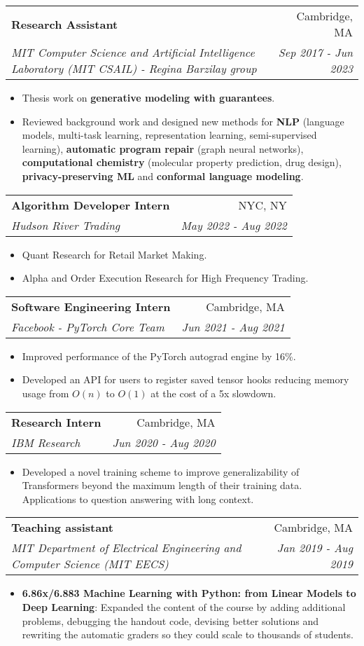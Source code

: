 \documentclass[letterpaper,10pt]{article}
\makeatletter
\newcommand{\resumeItem}[2]{
  \item\small{
    \textbf{#1}{: #2 \vspace{-2pt}}
  }
}
\newcommand{\resumeSubheading}[4]{
  \vspace{-1pt}\item[]
  \begin{tabular*}{0.98\textwidth}{l@{\extracolsep{\fill}}r}
      \hspace{-10pt}\textbf{#1} & #2 \\
      \hspace{-10pt}\textit{\small#3} & \textit{\small #4} \\
    \end{tabular*}\vspace{-5pt}
}
\newcommand{\resumeItemListStart}{\begin{itemize}}
\newcommand{\resumeItemListEnd}{\end{itemize}\vspace{-5pt}}
\makeatother
\begin{document}
    \resumeSubheading
      {Research Assistant}{Cambridge, MA}
      {MIT Computer Science and Artificial Intelligence Laboratory (MIT CSAIL) - Regina Barzilay group}{Sep 2017 - Jun 2023}
      \resumeItemListStart
      \item \small Thesis work on \textbf{generative modeling with guarantees}.
      \item \small Reviewed background work and designed new methods for \textbf{NLP} (language models, multi-task learning, representation learning, semi-supervised learning), \textbf{automatic program repair} (graph neural networks), \textbf{computational chemistry} (molecular property prediction, drug design), \textbf{privacy-preserving ML} and \textbf{conformal language modeling}.
      \resumeItemListEnd

    \resumeSubheading
      {Algorithm Developer Intern}{NYC, NY}
      {Hudson River Trading}{May 2022 - Aug 2022}
      \resumeItemListStart
          \item \small Quant Research for Retail Market Making.
          \item \small Alpha and Order Execution Research for High Frequency Trading.
      \resumeItemListEnd


    \resumeSubheading
      {Software Engineering Intern}{Cambridge, MA}
      {Facebook - PyTorch Core Team}{Jun 2021 - Aug 2021}
      \resumeItemListStart
          \item \small Improved performance of the PyTorch autograd engine by 16\%.
          \item \small Developed an API for users to register saved tensor hooks reducing memory usage from $O(n)$ to $O(1)$ at the cost of a 5x slowdown.
      \resumeItemListEnd


    \resumeSubheading
      {Research Intern}{Cambridge, MA}
      {IBM Research}{Jun 2020 - Aug 2020}
      \resumeItemListStart
        \item \small Developed a novel training scheme to improve generalizability of Transformers beyond the maximum length of their training data. Applications to question answering with long context.
      \resumeItemListEnd


    \resumeSubheading
      {Teaching assistant}{Cambridge, MA}
      {MIT Department of Electrical Engineering and Computer Science (MIT EECS)}{Jan 2019 - Aug 2019}
      \resumeItemListStart
      \resumeItem{6.86x/6.883 Machine Learning with Python: from Linear Models to Deep Learning}{Expanded the content of the course by adding additional problems, debugging the handout code, devising better solutions and rewriting the automatic graders so they could scale to thousands of students.}
      \resumeItemListEnd
\end{document}
